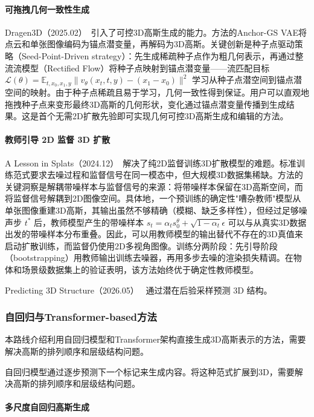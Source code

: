 \paragraph{可拖拽几何一致性生成}

Dragen3D（2025.02）~\cite{2502_16475}引入了可控3D高斯生成的能力。方法的Anchor-GS VAE将点云和单张图像编码为锚点潜变量，再解码为3D高斯。关键创新是种子点驱动策略（Seed-Point-Driven strategy）：先生成稀疏种子点作为粗几何表示，再通过整流流模型（Rectified Flow）将种子点映射到锚点潜变量——流匹配目标 $\mathcal{L}(\theta) = \mathbb{E}_{t, x_0, x_1, y}\|v_\theta(x_t, t, y) - (x_1 - x_0)\|^2$ 学习从种子点潜空间到锚点潜空间的映射。由于种子点稀疏且易于学习，几何一致性得到保证。用户可以直观地拖拽种子点来变形最终3D高斯的几何形状，变化通过锚点潜变量传播到生成结果。这是首个无需2D扩散先验即可实现几何可控3D高斯生成和编辑的方法。

\paragraph{教师引导 2D 监督 3D 扩散}

A Lesson in Splats（2024.12）~\cite{2412_00623}解决了纯2D监督训练3D扩散模型的难题。标准训练范式要求去噪过程和监督信号在同一模态中，但大规模3D数据集稀缺。方法的关键洞察是解耦带噪样本与监督信号的来源：将带噪样本保留在3D高斯空间，而将监督信号解耦到2D图像空间。具体地，一个预训练的确定性"嘈杂教师"模型从单张图像重建3D高斯，其输出虽然不够精确（模糊、缺乏多样性），但经过足够噪声步 $t^*$ 后，教师模型产生的带噪样本 $s_t = \alpha_t s_0^\theta + \sqrt{1-\alpha_t}\epsilon$ 可以与从真实3D数据出发的带噪样本分布重叠。因此，可以用教师模型的输出替代不存在的3D真值来启动扩散训练，而监督仍使用2D多视角图像。训练分两阶段：先引导阶段（bootstrapping）用教师输出训练去噪器，再用多步去噪的渲染损失精调。在物体和场景级数据集上的验证表明，该方法始终优于确定性教师模型。

Predicting 3D Structure（2026.05）~\cite{2605_10830} 通过潜在后验采样预测 3D 结构。

\subsubsection{自回归与Transformer-based方法}

本路线介绍利用自回归模型和Transformer架构直接生成3D高斯表示的方法，需要解决高斯的排列顺序和层级结构问题。

自回归模型通过逐步预测下一个标记来生成内容。将这种范式扩展到3D，需要解决高斯的排列顺序和层级结构问题。

\paragraph{多尺度自回归高斯生成}

